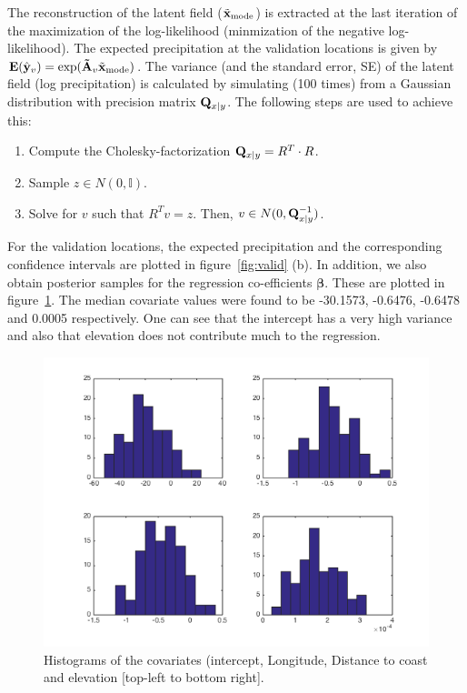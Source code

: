 \documentclass[a4paper,10pt]{article}
\def\bE{{\bf E}}
\def\bQ{{\bf Q}}
\def\btA{{\bf \tilde A}}
\def\bx{{\bf x}}
\def\by{{\bf y}}
\def\bbeta{{\boldsymbol \beta}}
\def\txmode{{\tilde \bx_{\mathrm{mode}}}}
\begin{document}
The reconstruction of the latent field ($\txmode$) is extracted at the last iteration of the maximization of the log-likelihood (minmization of the negative log-likelihood). The expected precipitation at the validation locations is given by $\bE(\hat \by_v) = \exp(\btA_v \txmode)$. The variance (and the standard error, SE) of the latent field (log precipitation) is calculated by simulating (100 times) from a Gaussian distribution with precision matrix $\bQ_{x|y}$. The following steps are used to achieve this:
\begin{enumerate}
 \item Compute the Cholesky-factorization $\bQ_{x|y} = R^T\cdot R$.
 \item Sample $z \in N(0,\mathbb{I})$.
 \item Solve for $v$ such that $R^T v = z$. Then, $v \in N(0,\bQ_{x|y}^{-1})$.
\end{enumerate} 
For the validation locations, the expected precipitation and the corresponding confidence intervals are plotted in figure~\ref{fig:valid} (b). In addition, we also obtain posterior samples for the regression co-efficients $\bbeta$. These are plotted in figure~\ref{fig:covariates}. The median covariate values were found to be -30.1573, -0.6476, -0.6478 and 0.0005 respectively. One can see that the intercept has a very high variance and also that elevation does not contribute much to the regression.
\begin{figure}[ht]
 \centering
 \includegraphics[width=0.8\linewidth]{covariates.png}
 \caption{Histograms of the covariates (intercept, Longitude, Distance to coast and elevation [top-left to bottom right].}
 \label{fig:covariates}
\end{figure}
\end{document}
